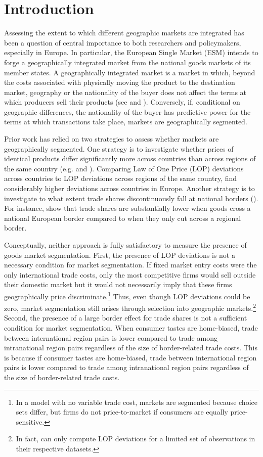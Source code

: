 \section{Introduction}  

Assessing the extent to which different geographic markets are integrated has been a question of central importance to both researchers and policymakers, especially in Europe. In particular, the European Single Market (ESM) intends to forge a geographically integrated market from the national goods markets of its member states. A geographically integrated market is a market in which, beyond the costs associated with physically moving the product to the destination market, geography or the nationality of the buyer does not affect the terms at which producers sell their products (see \citet{Flam1992} and \citet{Goldberg1997}). Conversely, if, conditional on geographic differences, the nationality of the buyer has predictive power for the terms at which transactions take place, markets are geographically segmented. 

Prior work has relied on two strategies to assess whether markets are geographically segmented. One strategy is to investigate whether prices of identical products differ significantly more across countries than across regions of the same country (e.g. \citet{Engel1996} and \citet{Goldberg1997}). Comparing Law of One Price (LOP) deviations across countries to LOP deviations across regions of the same country, \citet{Beck2020} find considerably higher deviations across countries in Europe. Another strategy is to investigate to what extent trade shares discontinuously fall at national borders (\citet{McCallum1995}). For instance, \citet{Santamaria2023} show that trade shares are substantially lower when goods cross a national European border compared to when they only cut across a regional border.

Conceptually, neither approach is fully satisfactory to measure the presence of goods market segmentation. First, the presence of LOP deviations is not a necessary condition for market segmentation. If fixed market entry costs were the only international trade costs, only the most competitive firms would sell outside their domestic market but it would not necessarily imply that these firms geographically price discriminate.\footnote{In a \citet{Melitz2003} model with no variable trade cost, markets are segmented because choice sets differ, but firms do not price-to-market if consumers are equally price-sensitive.} Thus, even though LOP deviations could be zero, market segmentation still arises through selection into geographic markets.\footnote{In fact, \citet{Cavallo2014} \cite{Beck2020} can only compute LOP deviations for a limited set of observations in their respective datasets.} Second, the presence of a large border effect for trade shares is not a sufficient condition for market segmentation. When consumer tastes are home-biased, trade between international region pairs is lower compared to trade among intranational region pairs regardless of the size of border-related trade costs. This is because if consumer tastes are home-biased, trade between international region pairs is lower compared to trade among intranational region pairs regardless of the size of border-related trade costs.

